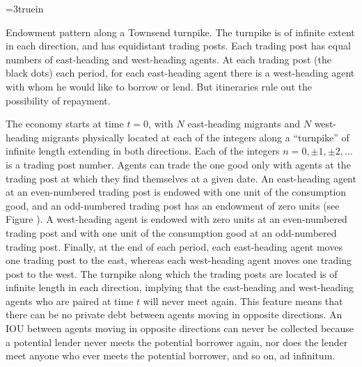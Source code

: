
\centerline{\epsfxsize=3truein}
\caption{Endowment pattern along a Townsend turnpike.  The turnpike
is of infinite extent in each direction, and has equidistant trading
posts.  Each trading post has equal numbers of east-heading and west-heading
agents.  At each trading post (the black dots) each period, for each
east-heading agent there is a west-heading agent with whom he would like
to borrow or lend.  But itineraries rule out the possibility of repayment.}
\endfigure

The economy starts at time $t=0$, with $N$ east-heading migrants and $N$
west-heading migrants physically located at each of the integers along a
``turnpike'' of infinite length extending in both directions.  Each of the
integers $n=0,\pm 1, \pm 2,\ldots$ is a trading post number.  Agents can
trade the one good only with agents at the trading post at which they find
themselves at a given date.  An east-heading agent at an even-numbered
trading post is endowed with one unit of the consumption good, and an
odd-numbered trading post has an endowment of zero units (see Figure ). %
  A
west-heading agent is endowed with zero units at an even-numbered trading post
and with one unit of the consumption good at an odd-numbered trading post.
Finally, at the end of each period, each east-heading agent moves one trading
post to the east, whereas each west-heading agent moves one trading post to the
west.  The turnpike along which the trading posts are located is of infinite
length in each direction, implying that the east-heading and west-heading
agents who are paired at time $t$ will never meet again.  This feature means
that there can be no private debt between agents moving in opposite directions.
An IOU between agents moving in opposite directions can never be collected
because a potential lender never meets the potential borrower again, nor does
the lender meet anyone who ever meets the potential borrower, and so on, ad
infinitum.

